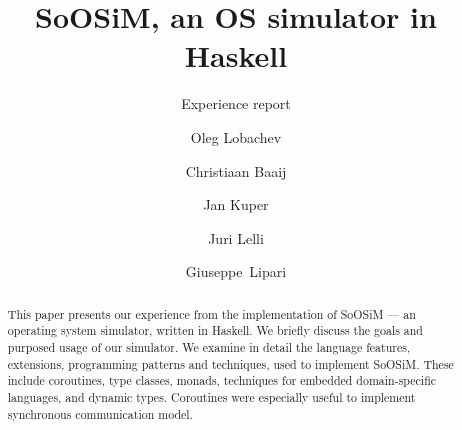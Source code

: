 \documentclass{llncs}
\newcommand{\soosim}{SoOSiM\xspace}
\begin{document}
\title{\soosim, an OS simulator in Haskell}
\subtitle{Experience report}


\author{Oleg Lobachev \and Christiaan Baaij \and Jan
  Kuper \and Juri Lelli \and Giuseppe~Lipari} 



\maketitle



\begin{abstract}
This paper presents our experience from the implementation of \soosim{} --- an operating system simulator, written in Haskell.
We briefly discuss the goals and purposed usage of our simulator.
We examine in detail the language features, extensions, programming patterns and techniques, used to implement \soosim.
These include coroutines, type classes, monads, techniques for embedded domain-specific languages, and dynamic types.
Coroutines were especially useful to implement synchronous communication model.
\end{abstract}



\end{document}
